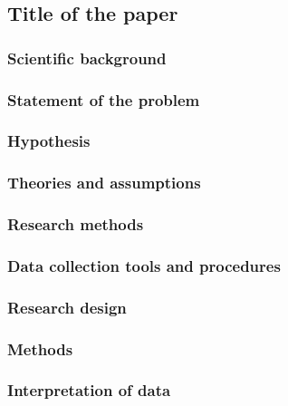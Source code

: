 \subsection{Title of the paper \citep{ref}}
\label{task:@label}


\subsubsection{Scientific background}

\subsubsection{Statement of the problem}

\subsubsection{Hypothesis}

\subsubsection{Theories and assumptions}

\subsubsection{Research methods}

\subsubsection{Data collection tools and procedures}

\subsubsection{Research design}

\subsubsection{Methods}

\subsubsection{Interpretation of data}

